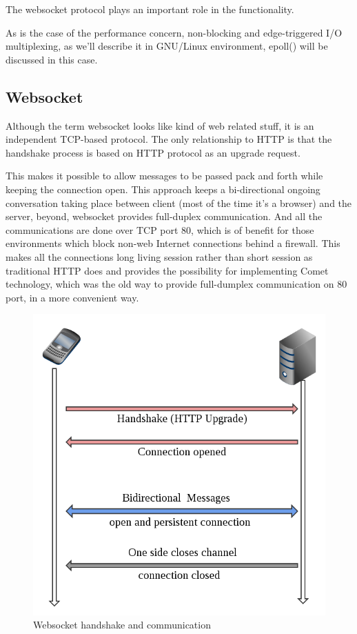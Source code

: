 \documentclass[numbers,numberedpars]{sigplanconf}
\begin{document}
The websocket protocol plays an important role in the functionality.

As is the case of the performance concern, non-blocking and edge-triggered I/O multiplexing, as we'll describe it in GNU/Linux environment, epoll()
will be discussed in this case.

\subsection{Websocket} \label{Websocket}

Although the term websocket looks like kind of web related stuff, it is an independent TCP-based protocol.
The only relationship to HTTP is that the handshake process is based on HTTP protocol as an upgrade request.

This makes it possible to allow messages to be passed pack and forth while keeping the connection open.
This approach keeps a bi-directional ongoing conversation taking place between client (most of the time it's a browser) and the server,
beyond, websocket provides full-duplex communication.
And all the communications are done over TCP port 80, which is of benefit for those environments which block non-web Internet connections
behind a firewall. This makes all the connections long living session rather than short session as traditional HTTP does and provides the
possibility for implementing Comet technology, which was the old way to provide full-dumplex communication on 80 port, in a more convenient way.

\begin{figure}[tbph]
  \centering
  \label{fig:websocket_connection}
  \includegraphics[scale=0.3]{websocket.png}
  \caption{Websocket handshake and communication}
\end{figure}
\end{document}
